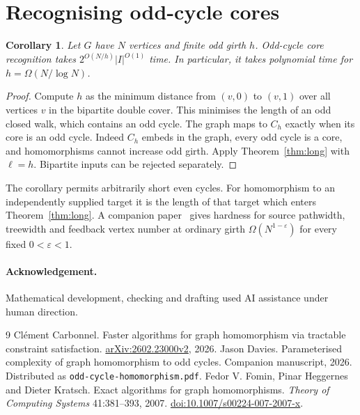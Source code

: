 \documentclass[11pt]{article}
\newtheorem{corollary}[theorem]{Corollary}
\begin{document}
\section{Recognising odd-cycle cores}
\begin{corollary}
Let $G$ have $N$ vertices and finite odd girth $h$. Odd-cycle core
recognition takes $2^{O(N/h)}|I|^{O(1)}$ time. In particular, it takes
polynomial time for
$h=\Omega(N/\log N)$.
\end{corollary}
\begin{proof}
Compute $h$ as the minimum distance from $(v,0)$ to $(v,1)$ over all
vertices $v$ in the bipartite double cover. This minimises the length
of an odd closed walk, which contains an odd cycle. The graph maps to
$C_h$ exactly when its core is an odd cycle. Indeed $C_h$ embeds in the
graph, every odd cycle is a core, and homomorphisms cannot increase odd
girth. Apply Theorem~\ref{thm:long} with $\ell=h$. Bipartite inputs can
be rejected separately.
\end{proof}

The corollary permits arbitrarily short even cycles. For homomorphism to
an independently supplied target it is the length of that target which
enters Theorem~\ref{thm:long}. A companion paper~\cite{structural} gives
hardness for source pathwidth, treewidth and feedback vertex number at
ordinary girth $\Omega(N^{1-\varepsilon})$ for every fixed
$0<\varepsilon<1$.

\paragraph{Acknowledgement.}
Mathematical development, checking and drafting used AI assistance under
human direction.
\begin{thebibliography}{9}
Cl\'ement Carbonnel. Faster algorithms for graph homomorphism via tractable
constraint satisfaction. \href{https://arxiv.org/abs/2602.23000v2}{arXiv:2602.23000v2}, 2026.
Jason Davies. Parameterised complexity of graph homomorphism to odd cycles.
Companion manuscript, 2026. Distributed as \texttt{odd-cycle-homomorphism.pdf}.
Fedor V. Fomin, Pinar Heggernes and Dieter Kratsch.
Exact algorithms for graph homomorphisms.
\emph{Theory of Computing Systems} 41:381--393, 2007.
\href{https://doi.org/10.1007/s00224-007-2007-x}{doi:10.1007/s00224-007-2007-x}.
\end{thebibliography}
\end{document}
